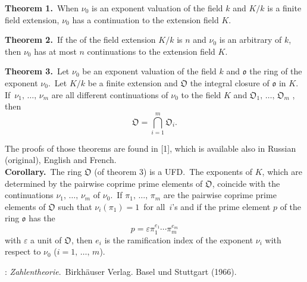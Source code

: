 \documentclass[12pt]{article}
\theoremstyle{definition}
\begin{document}
 

\textbf{Theorem 1.}\, When $\nu_0$ is an exponent valuation of the field $k$ and $K/k$ is a finite field extension, $\nu_0$ has a continuation to the extension field $K$.

\textbf{Theorem 2.}\, If the  of the field extension $K/k$ is $n$ and $\nu_0$ is an arbitrary  of $k$, then $\nu_0$ has at most $n$ continuations to the extension field $K$.

\textbf{Theorem 3.}\, Let $\nu_0$ be an exponent valuation of the field $k$ and $\mathfrak{o}$ the ring of the exponent $\nu_0$.\, Let $K/k$ be a finite extension and $\mathfrak{O}$ the integral closure of $\mathfrak{o}$ in $K$.\, If\, $\nu_1,\,\ldots,\,\nu_m$ are all different continuations of $\nu_0$ to the field $K$ and $\mathfrak{O}_1,\,\ldots,\,\mathfrak{O}_m$ , then
$$\mathfrak{O} = \bigcap_{i=1}^m\mathfrak{O}_i.$$



The proofs of those theorems are found in [1], which is available also in Russian (original), English and French.\\

\textbf{Corollary.}\, The ring $\mathfrak{O}$ (of theorem 3) is a UFD.\, The exponents of $K$, which are determined by the pairwise coprime prime elements of $\mathfrak{O}$, coincide with the continuations $\nu_1,\,\ldots,\,\nu_m$ of $\nu_0$.\, If $\pi_1,\,\ldots,\,\pi_m$ are the pairwise coprime prime elements of $\mathfrak{O}$ such that\; $\nu_i(\pi_1) = 1$\, for all\, $i$'s and if the prime element $p$ of the ring $\mathfrak{o}$ has the 
$$p = \varepsilon\pi_1^{e_1}\cdots\pi_m^{e_m}$$
with $\varepsilon$ a unit of $\mathfrak{O}$, then $e_i$ is the ramification index of the exponent $\nu_i$ with respect to $\nu_0$ ($i = 1,\,\ldots,\,m$).



\begin{thebibliography}{9}
: {\em Zahlentheorie}.\, Birkh\"auser Verlag. Basel und Stuttgart (1966).
\end{thebibliography}

\end{document}
